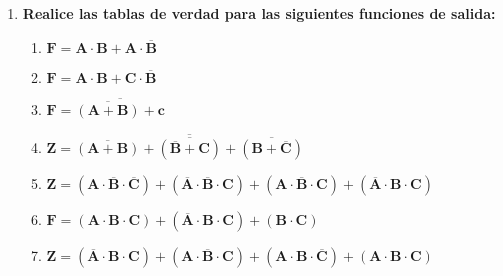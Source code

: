 \documentclass[12pt]{article}
\begin{document}
\begin{enumerate}[label = \textbf{\alph*.}]
\begin{enumerate}[label = \textbf{\arabic*.}]
                \end{enumerate}

            \item \textbf{Realice las tablas de verdad para las siguientes funciones de salida:}
                \begin{enumerate}[label = \textbf{\arabic*.}]
                    \item $\mathbf{F = A \cdot B + A \cdot \overline{B}}$
                    
                    \item $\mathbf{F = A \cdot B + C \cdot \overline{B}}$
                    
                    \item $\mathbf{F = \overline{\overline{(A + B)} + c}}$
                    
                    \item $\mathbf{Z = \overline{\overline{(A + B)} + \overline{(\overline{B} + C)} + \overline{(B + \overline{C})}}}$
                    
                    \item $\mathbf{Z = (A \cdot \overline{B} \cdot \overline{C}) + (\overline{A} \cdot \overline{B} \cdot C) + (A \cdot \overline{B} \cdot C) + (\overline{A} \cdot B \cdot C)}$
                    
                    \item $\mathbf{F = (A \cdot B \cdot C) + (\overline{A} \cdot B \cdot C) + (B \cdot C)}$
                    
                    \item $\mathbf{Z = (\overline{A} \cdot B \cdot C) + (A \cdot \overline{B} \cdot C) + (A \cdot B \cdot \overline{C}) + (A \cdot B \cdot C)}$
                \end{enumerate}

        \end{enumerate}
\end{document}
